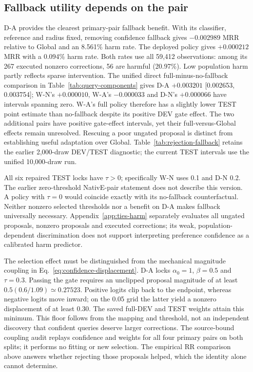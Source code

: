 \documentclass[11pt,a4paper]{article}
\begin{document}
\subsection{Fallback utility depends on the pair}
\label{sec:fallback-results}
D-A provides the clearest primary-pair fallback benefit. With its classifier, reference and radius fixed, removing confidence fallback gives $-0.002989$ MRR relative to Global and an 8.561\% harm rate. The deployed policy gives $+0.000212$ MRR with a 0.094\% harm rate. Both rates use all 59,412 observations: among its 267 executed nonzero corrections, 56 are harmful (20.97\%). Low population harm partly reflects sparse intervention. The unified direct full-minus-no-fallback comparison in Table~\ref{tab:query-components} gives D-A $+0.003201$ [0.002653, 0.003754]; W-N's $+0.000010$, W-A's $-0.000033$ and D-N's $+0.000066$ have intervals spanning zero. W-A's full policy therefore has a slightly lower TEST point estimate than no-fallback despite its positive DEV gate effect. The two additional pairs have positive gate-effect intervals, yet their full-versus-Global effects remain unresolved. Rescuing a poor ungated proposal is distinct from establishing useful adaptation over Global. Table~\ref{tab:rejection-fallback} retains the earlier 2,000-draw DEV/TEST diagnostic; the current TEST intervals use the unified 10,000-draw run.


All six repaired TEST locks have $\tau>0$; specifically W-N uses 0.1 and D-N 0.2. The earlier zero-threshold NativE-pair statement does not describe this version. A policy with $\tau=0$ would coincide exactly with its no-fallback counterfactual. Neither nonzero selected thresholds nor a benefit on D-A makes fallback universally necessary. Appendix~\ref{app:ties-harm} separately evaluates all ungated proposals, nonzero proposals and executed corrections; its weak, population-dependent discrimination does not support interpreting preference confidence as a calibrated harm predictor.


The selection effect must be distinguished from the mechanical magnitude coupling in Eq.~\eqref{eq:confidence-displacement}. D-A locks $\alpha_0=1$, $\beta=0.5$ and $\tau=0.3$. Passing the gate requires an unclipped proposal magnitude of at least $0.5(0.6/1.09)\simeq0.27523$. Positive logits clip back to the endpoint, whereas negative logits move inward; on the 0.05 grid the latter yield a nonzero displacement of at least 0.30. The saved full-DEV and TEST weights attain this minimum. This floor follows from the mapping and threshold, not an independent discovery that confident queries deserve larger corrections. The source-bound coupling audit replays confidence and weights for all four primary pairs on both splits; it performs no fitting or new selection. The empirical RR comparison above answers whether rejecting those proposals helped, which the identity alone cannot determine.
\end{document}
